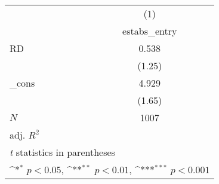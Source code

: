 {
\def\sym#1{\ifmmode^{#1}\else\(^{#1}\)\fi}
\begin{tabular}{l*{1}{c}}
\toprule
            &\multicolumn{1}{c}{(1)}\\
            &\multicolumn{1}{c}{estabs\_entry}\\
\midrule
RD          &       0.538         \\
            &      (1.25)         \\
\addlinespace
\_cons      &       4.929         \\
            &      (1.65)         \\
\midrule
\(N\)       &        1007         \\
adj. \(R^{2}\)&                     \\
\bottomrule
\multicolumn{2}{l}{\footnotesize \textit{t} statistics in parentheses}\\
\multicolumn{2}{l}{\footnotesize \sym{*} \(p<0.05\), \sym{**} \(p<0.01\), \sym{***} \(p<0.001\)}\\
\end{tabular}
}
